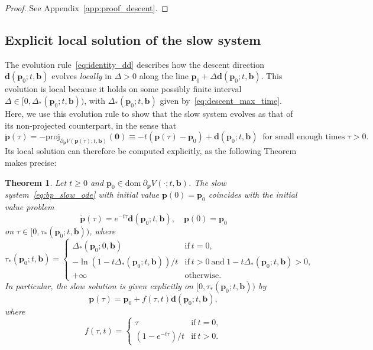 \documentclass[11pt]{article}
\numberwithin{prop}{section}
\numberwithin{lem}{section}
\numberwithin{rem}{section}
\numberwithin{cor}{section}
\newtheorem{thm}{Theorem}[section]
\numberwithin{thm}{section}
\numberwithin{defn}{section}
\numberwithin{fact}{section}
\theoremstyle{plain}
\def\bb {\boldsymbol{b}}
\def\bd {\boldsymbol{d}}
\def\bp {\boldsymbol{p}}
\def\dom {\mathrm{dom~}}    %
\def\proj {\mathrm{proj}}
\def\bpo {\bp_{0}}
\begin{document}
\begin{proof}
See Appendix~\ref{app:proof_descent}.
\end{proof}


\subsection{Explicit local solution of the slow system}\label{subsec:local_solution}
The evolution rule~\eqref{eq:identity_dd} describes how the descent direction $\bd(\bpo;t,\bb)$ evolves \emph{locally} in $\Delta > 0$ along the line $\bpo + \Delta\bd(\bpo;t,\bb)$. This evolution is local because it holds on some possibly finite interval $\Delta \in [0,\Delta_{*}(\bpo;t,\bb))$, with $\Delta_{*}(\bpo;t,\bb)$ given by~\eqref{eq:descent_max_time}. Here, we use this evolution rule to show that the slow system evolves as that of its non-projected counterpart, in the sense that 
\[
\dot{\bp}(\tau) = -\proj_{\partial_{\bp} V(\bp(\tau);t,\bb)}(\boldsymbol{0}) \equiv -t(\bp(\tau) - \bpo) + \bd(\bpo;t,\bb) \ \text{ for small enough times $\tau > 0$.}
\]
Its local solution can therefore be computed explicitly, as the following Theorem makes precise:


\begin{thm}\label{thm:mr_local_sol}
Let $t \geqslant 0$ and $\bpo \in \dom \partial_{\bp} V(\cdot;t,\bb)$. The slow system~\eqref{eq:bp_slow_ode} with initial value $\bp(0) = \bpo$ coincides with the initial value problem
\begin{equation}\label{eq:dd_decay}
\dot{\bp}(\tau) = e^{-t\tau}\bd(\bpo;t,\bb), \quad \bp(0) = \bpo
\end{equation}
on $\tau \in [0,\tau_{*}(\bpo;t,\bb))$, where 
\begin{equation}\label{eq:thm_tau0}
\tau_{*}(\bpo;t,\bb) = 
\begin{cases}
    \Delta_{*}(\bpo;0,\bb) & \text{if} \ t = 0, \\
    -\ln\left(1-t\Delta_{*}(\bpo;t,\bb)\right)/t & \text{if} \ t > 0 \ \text{and} \ 1-t\Delta_{*}(\bpo;t,\bb) > 0, \\
    +\infty & \text{otherwise}.
\end{cases}
\end{equation}
In particular, the slow solution is given explicitly on $[0,\tau_{*}(\bpo;t,\bb))$ by
\begin{equation}\label{eq:slow_local_solution}
    \bp(\tau) = \bpo + f(\tau,t)\bd(\bpo;t,\bb),
\end{equation}
where 
\begin{equation}\label{eq:f_fun}
f(\tau,t) = \begin{cases}
    \tau & \text{if} \ t = 0,\\
    \left(1 - e^{-t\tau}\right)/t & \text{if} \ t > 0.
\end{cases}
\end{equation}
\end{thm}
\end{document}
